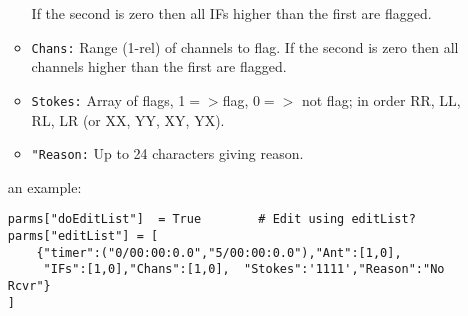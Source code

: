 \documentclass[11pt]{article}
\begin{document}
\begin{enumerate}
\begin{itemize}
If the second is zero then all IFs higher than the first are flagged.
\item{\tt Chans:} Range (1-rel) of channels to flag.
If the second is zero then all channels higher than the first are flagged.
\item{\tt Stokes:} Array of flags, 1$=>$flag, $0=>$ not flag; in order
  RR, LL, RL, LR (or XX, YY, XY, YX).
\item{\tt "Reason:} Up to 24 characters giving reason.
\end{itemize}
an example:
\begin{verbatim}
parms["doEditList"]  = True        # Edit using editList?
parms["editList"] = [
    {"timer":("0/00:00:0.0","5/00:00:0.0"),"Ant":[1,0],
     "IFs":[1,0],"Chans":[1,0],  "Stokes":'1111',"Reason":"No Rcvr"}
]
\end{verbatim}


\end{enumerate}
\end{document}
